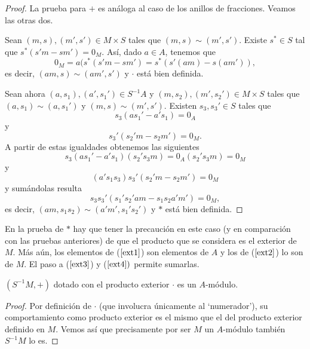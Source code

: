 \documentclass[../main.tex]{subfiles}
\begin{document}
	\begin{proof}
		La prueba para $+$ es análoga al caso de los anillos de fracciones. Veamos las otras dos.

		Sean $(m,s),(m',s')\in M\times S$ tales que $(m,s)\sim(m',s')$. Existe $s^*\in S$ tal que $s^*(s'm-sm')=0_M$. Así, dado $a\in A$, tenemos que
		$$0_M=a(s^*(s'm-sm')=s^*(s'(am)-s(am')),$$
		es decir, $(am,s)\sim (am',s')$ y $·$ está bien definida.

		Sean ahora $(a,s_1),(a',s_1')\in S^{-1}A$ y $(m,s_2),(m',s_2')\in M\times S$ tales que $(a,s_1)\sim(a,s_1')$ y $(m,s)\sim(m',s')$. Existen $s_3,s_3'\in S$ tales que
		\begin{equation}\label{ext1}
		s_3(as_1'-a's_1)=0_A
		\end{equation} y \begin{equation}\label{ext2}
		s_3'(s_2'm-s_2m')=0_M.
		\end{equation}
		A partir de estas igualdades obtenemos las siguientes
		\begin{equation}\label{ext3}
		s_3(as_1'-a's_1)(s_2's_3m)=0_A(s_2's_3m)=0_M
		\end{equation} y \begin{equation}\label{ext4}
		(a's_1s_3)s_3'(s_2'm-s_2m')=0_M
		\end{equation}
		y sumándolas resulta
		$$s_3s_3'(s_1's_2'am-s_1s_2a'm')=0_M,$$
		es decir, $(am,s_1s_2)\sim(a'm',s_1's_2')$ y $*$ está bien definida.
	\end{proof}

	\begin{remark}
		En la prueba de $*$ hay que tener la precaución en este caso (y en comparación con las pruebas anteriores) de que el producto que se considera es el exterior de $M$. Más aún, los elementos de ($\ref{ext1}$) son elementos de $A$ y los de ($\ref{ext2}$) lo son de $M$. El paso a ($\ref{ext3}$) y ($\ref{ext4})$ permite sumarlas.
	\end{remark}

	\begin{proposition}
		$(S^{-1}M,+)$ dotado con el producto exterior $·$ es un $A$-módulo.
	\end{proposition}

	\begin{proof}
		Por definición de $·$ (que involucra únicamente al `numerador'), su comportamiento como producto exterior es el mismo que el del producto exterior definido en $M$. Vemos así que precisamente por ser $M$ un $A$-módulo también $S^{-1}M$ lo es.
	\end{proof}
\end{document}
